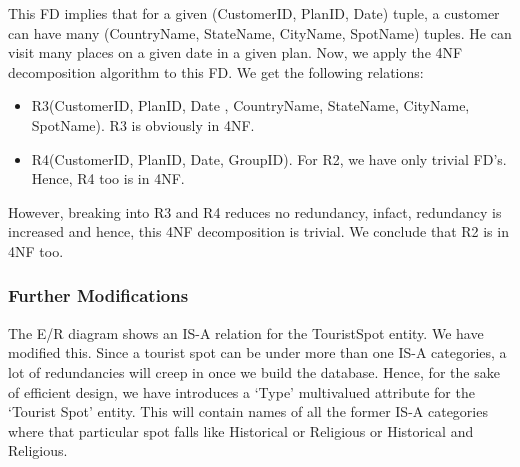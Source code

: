 \documentclass[a4paper,11pt]{article}
\begin{document}
\begin{itemize}
This FD implies that for a given (CustomerID, PlanID, Date) tuple, a customer can have many (CountryName, StateName, CityName, SpotName) tuples. He can visit many places on a given date in a given plan. Now, we apply the 4NF decomposition algorithm to this FD. We get the following relations:
\begin{itemize}
\item R3(CustomerID, PlanID, Date , CountryName, StateName, CityName, SpotName). R3 is obviously in 4NF.
\item R4(CustomerID, PlanID, Date, GroupID). For R2, we have only trivial FD’s. Hence, R4 too is in 4NF.
\end{itemize}
However, breaking into R3 and R4 reduces no redundancy, infact, redundancy is increased and hence, this 4NF decomposition is trivial. We conclude that R2 is in 4NF too. \newline
\end{itemize}

\subsubsection*{Further Modifications}
The E/R diagram shows an IS-A relation for the TouristSpot entity. We have modified this. Since a tourist spot can be under more than one IS-A categories, a lot of redundancies will creep in once we build the database. Hence, for the sake of efficient design, we have introduces a ‘Type’ multivalued attribute for the ‘Tourist Spot’ entity. This will contain names of all the former IS-A categories where that particular spot falls like Historical or Religious or Historical and Religious.
\end{document}
